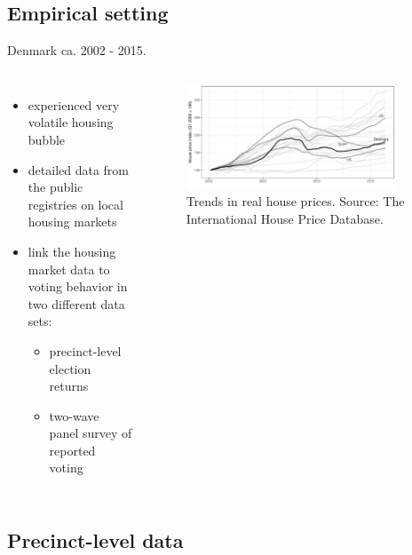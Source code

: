 \documentclass[10pt,aspectratio=169]{beamer}
\begin{document}
\subsection{Empirical setting}
\begin{frame}
Denmark ca. 2002 - 2015.\pause

\begin{columns}


\begin{itemize}[<+->]
	\item experienced very volatile housing bubble
	\item detailed data from the public registries on local housing markets 
	\item link the housing market data to voting behavior in two different data sets:
	\begin{itemize}[<+->]
		\item precinct-level election returns
		\item two-wave panel survey of reported voting
	\end{itemize}
\end{itemize}


	\begin{figure}[htbp!]
	\includegraphics[width=0.9\textwidth]{../../figures/timeplot}
	\centering
	\caption{Trends in real house prices. Source: The International House Price Database.}\label{hpd}
\end{figure}

\end{columns}


\end{frame}

\subsection{Precinct-level data}
\end{document}
